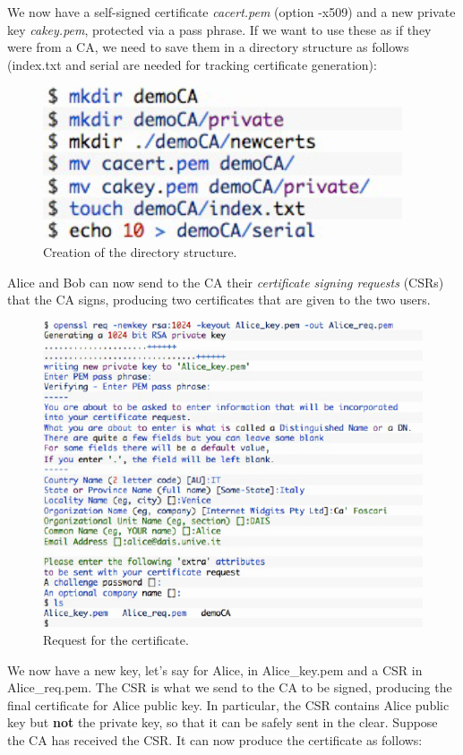 \documentclass[a4paper, 12pt]{report}
\begin{document}
We now have a self-signed certificate \textit{cacert.pem} (option -x509) and a new private key \textit{cakey.pem}, protected via a pass phrase. If we want to use these as if they were from a CA, we need to save them in a directory structure as follows (index.txt and serial are needed for tracking certificate generation):

\begin{figure}[H]
	\centering
	\includegraphics[scale=0.7]{images/Lec23/cert2.png}
	\caption{Creation of the directory structure.}
	\label{fig:cert2}
\end{figure}

Alice and Bob can now send to the CA their \textit{certificate signing requests} (CSRs) that the CA signs, producing two certificates that are given to the two users.

\begin{figure}[H]
	\centering
	\includegraphics[scale=1]{images/Lec23/cert3.png}
	\caption{Request for the certificate.}
	\label{fig:cert3}
\end{figure}

We now have a new key, let's say for Alice, in Alice\_key.pem and a CSR in Alice\_req.pem. The CSR is what we send to the CA to be signed, producing the final certificate for Alice public key. In particular, the CSR contains Alice public key but \textbf{not} the private key, so that it can be safely sent in the clear. Suppose the CA has received the CSR. It can now produce the certificate as follows:
\end{document}
